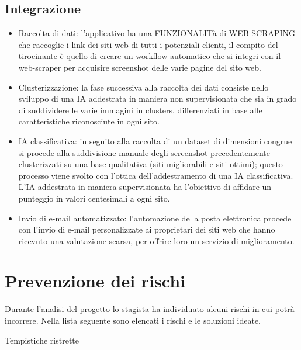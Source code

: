 \subsection{Integrazione}
\begin{itemize}
    \item Raccolta di dati: l'applicativo ha una FUNZIONALITà di WEB-SCRAPING che raccoglie i link dei siti web di tutti i potenziali clienti, il compito del tirocinante è quello di creare un workflow automatico che si integri con il web-scraper per acquisire screenshot delle varie pagine del sito web. 
    \item Clusterizzazione: la fase successiva alla raccolta dei dati consiste nello sviluppo di una IA addestrata in maniera non supervisionata che sia in grado di suddividere le varie immagini in clusters, differenziati in base alle caratteristiche riconosciute in ogni sito. 
    \item IA classificativa: in seguito alla raccolta di un dataset di dimensioni congrue si procede alla suddivisione manuale degli screenshot precedentemente clusterizzati su una base qualitativa (siti migliorabili e siti ottimi); questo processo viene svolto con l'ottica dell'addestramento di una IA classificativa.
    L'IA addestrata in maniera supervisionata ha l'obiettivo di affidare un punteggio in valori centesimali a ogni sito. 
    \item Invio di e-mail automatizzato: l'automazione della posta elettronica procede con l'invio di e-mail personalizzate ai proprietari dei siti web che hanno ricevuto una valutazione scarsa, per offrire loro un servizio di miglioramento.
\end{itemize}

\section{Prevenzione dei rischi}
Durante l'analisi del progetto lo stagista ha individuato alcuni rischi in cui potrà incorrere.
Nella lista seguente sono elencati i rischi e le soluzioni ideate.\\

\begin{risk}{Tempistiche ristrette}
    \label{risk: tempistiche ristrette} 
\end{risk}

